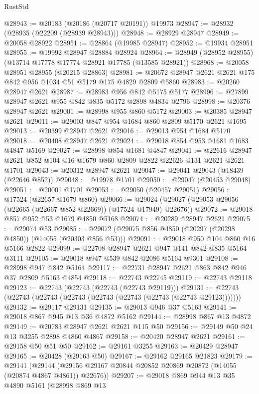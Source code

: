 \begin{lexlean}{RustStd}
\begin{coremodule}
@28943 := @20183 (@20186 (@20717 @20191)) @19973
@28947 := @28932 (@28935 (@22209 (@28939 @28943)))
@28948 := @28929 @28947
@28949 := @20058 @28922
@28951 := @28864 (@19985 @28947)
@28952 := @19934 @28951
@28955 := @19992 @28947 @28884 @28924
@28964 := @28949 (@28952 @28955) (@13714 @17778 @17774 @28921 @17785 (@13585 @28921))
@28968 := @20058 @28951 @28955 (@20215 @28863)
@28981 := @20672 @28947 @2621 @2621 @175 @842 @956 @1034 @51 @5179 @175 @4829 @2809 @5860
@28983 := @20260 @28947 @2621
@28987 := @28983 @956 @842 @5175 @5177
@28996 := @27899 @28947 @2621 @955 @842 @835 @5172 @2898 @4834 @2796
@28998 := @20376 @28947 @2621
@29001 := @28998 @955 @860 @5172
@29003 := @20385 @28947 @2621
@29011 := @29003 @847 @954 @1684 @860 @2809 @5170 @2621 @1695
@29013 := @20399 @28947 @2621
@29016 := @29013 @954 @1684 @5170
@29018 := @20408 @28947 @2621
@29024 := @29018 @854 @953 @1681 @1683 @4847 @5169
@29027 := @28998 @854 @1681 @4847
@29041 := @22616 @28947 @2621 @852 @104 @16 @1679 @860 @2809 @2822 @22626 @131 @2621 @2621 @1701
@29043 := @20312 @28947 @2621
@29047 := @29041 @29043 (@18439 (@22646 @852))
@29048 := @19978 @1701
@29050 := @29047 (@20453 @29048)
@29051 := @20001 @1701
@29053 := @29050 (@20457 @29051)
@29056 := @17524 (@22657 @1679 @860)
@29066 := @29024 (@29027 (@29053 @29056 (@22665 (@22667 @852 @22669)) (@17524 @17949) @22676))
@29072 := @29018 @857 @952 @53 @1679 @4850 @5168
@29074 := @20289 @28947 @2621
@29075 := @29074 @53
@29085 := @29072 (@29075 @856 @4850 (@20297 (@20298 @4850)) (@14055 (@20303 @856 @53)))
@29091 := @29018 @950 @104 @860 @16 @5166 @2822
@29099 := @22708 @28947 @2621 @947 @141 @842 @835 @5164 @3111
@29105 := @29018 @947 @539 @842 @2086 @5164 @9301
@29108 := @28998 @947 @842 @5164
@29117 := @22731 @28947 @2621 @863 @842 @946 @37 @2809 @5163 @4854
@29118 := @22743 @22745
@29119 := @22743 @29118
@29123 := @22743 (@22743 (@22743 (@22743 @29119)))
@29131 := @22743 (@22743 (@22743 (@22743 (@22743 (@22743 (@22743 (@22743 @29123)))))))
@29132 := @29117 @29131
@29135 := @29013 @946 @37 @5163
@29141 := @29018 @867 @945 @13 @36 @4872 @5162
@29144 := @28998 @867 @13 @4872
@29149 := @20783 @28947 @2621 @2621 @115 @50
@29156 := @29149 @50 @24 @13 @3255 @2898 @4860 @4867
@29158 := @20420 @28947 @2621
@29161 := @29158 @50 @51 @50
@29162 := @29161 @3255
@29163 := @20429 @28947
@29165 := @20428 (@29163 @50)
@29167 := @29162 @29165 @21823
@29179 := @29141
    (@29144 (@29156 @29167 @20844 @20852 @20869 @20872 (@14055 (@20874 @4867 @4861)) @22676))
@29207 := @29018
    @869
    @944
    @13
    @35
    @4890
    @5161
    (@28998
      @869
      @13

\end{coremodule}
\end{lexlean}

